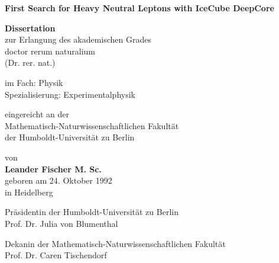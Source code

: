 \thispagestyle{plain}
\begin{center}
	\vspace*{1cm}

	\LARGE
	\textbf{First Search for Heavy Neutral Leptons with IceCube DeepCore}
	\large

	\vspace{0.8cm}

	\textbf{Dissertation}\\
	zur Erlangung des akademischen Grades\\
	doctor rerum naturalium \\
	(Dr. rer. nat.) \\

	\vspace{0.5cm}

	im Fach: Physik \\
	Spezialisierung: Experimentalphysik\\

	\vspace{0.5cm}

	eingereicht an der \\
	Mathematisch-Naturwissenschaftlichen Fakultät\\
	der Humboldt-Universität zu Berlin\\

	\vspace{0.5cm}

	von\\
	\textbf{Leander Fischer M. Sc.}\\
	geboren am 24. Oktober 1992\\
	in Heidelberg

	\vspace{0.5cm}

	Präsidentin der Humboldt-Universität zu Berlin \\
	Prof. Dr. Julia von Blumenthal \\

	\vspace{0.5cm}

	Dekanin der Mathematisch-Naturwissenschaftlichen Fakultät \\
	Prof. Dr. Caren Tischendorf \\

	\vspace{0.5cm}




\end{center}

